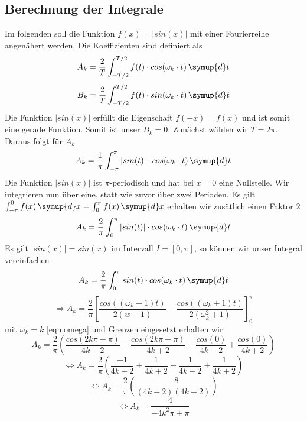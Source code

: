 \subsection{Berechnung der Integrale}
Im folgenden soll die Funktion $f(x)=|sin(x)|$ mit einer Fourierreihe angenähert werden.
Die Koeffizienten sind definiert als
\begin{equation}
A_k=\frac{2}{T} \int_{-T/2}^{T/2} f(t) \cdot cos(\omega_k \cdot t)  \, \symup{d}t
\end{equation}
\begin{equation}
B_k=\frac{2}{T} \int_{-T/2}^{T/2} f(t) \cdot sin(\omega_k \cdot t)  \, \symup{d}t
\end{equation}
Die Funktion $|sin(x)|$ erfüllt die Eigenschaft $f(-x) = f(x)$ und ist somit eine gerade Funktion.
Somit ist unser $B_k=0$. 
Zunächst wählen wir $T=2\pi$. Daraus folgt für $A_k$
\begin{equation}
A_k=\frac{1}{\pi} \int_{-\pi}^{\pi} |sin(t)| \cdot cos(\omega_k \cdot t) \, \symup{d}t
\end{equation}
Die Funktion $|sin(x)|$ ist $\pi$-periodisch und hat bei $x = 0$ eine Nullstelle.
Wir integrieren nun über eine, statt wie zuvor über zwei Perioden. Es gilt 
$\int_{-\pi}^{0}f(x) \, \symup{d}x = \int_0^{\pi} f(x) \, \symup{d}x$
erhalten wir zusätlich einen Faktor $2$
\begin{equation}
A_k=\frac{2}{\pi} \int_0^{\pi} |sin(t)| \cdot cos(\omega_k \cdot t) \, \symup{d}t
\end{equation}
Es gilt $|sin(x)| = sin(x)$ im Intervall $I=[0,\pi]$, so können wir
unser Integral vereinfachen
\begin{equation}
A_k=\frac{2}{\pi} \int_0^{\pi} sin(t) \cdot cos(\omega_k \cdot t)  \, \symup{d}t
\end{equation}
\begin{equation}
\Rightarrow A_k= \frac{2}{\pi} \left [ \frac{cos((\omega_k-1)t)}{2(w-1)} - \frac{cos((\omega_k+1)t)}{2(\omega_k^2+1)} \right ]_0^{\pi}
\end{equation}
mit $\omega_k=k$
\eqref{eqn:omega}
und Grenzen eingesetzt erhalten wir
\begin{equation}
A_k=\frac{2}{\pi}\left ( \frac{cos(2k\pi-\pi)}{4k-2} - \frac{cos(2k\pi+\pi)}{4k+2} - \frac{cos(0)}{4k-2} + \frac{cos(0)}{4k+2} \right )
\end{equation}
\begin{equation}
\Leftrightarrow A_k=\frac{2}{\pi}\left ( \frac{-1}{4k-2} + \frac{1}{4k+2} - \frac{1}{4k-2} + \frac{1}{4k+2} \right )
\end{equation}
\begin{equation}
\Leftrightarrow A_k= \frac{2}{\pi} \left ( \frac{-8}{(4k-2)(4k+2)} \right )
\end{equation}
\begin{equation}
\Leftrightarrow A_k= \frac{4}{-4k^2 \pi + \pi}
\end{equation}
